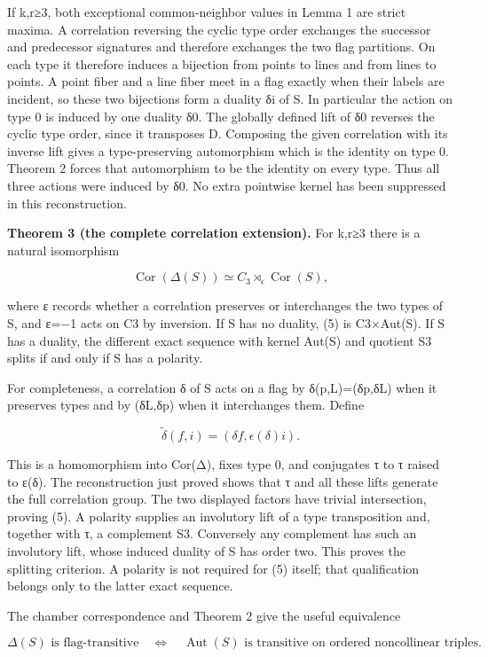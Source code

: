 If k,r≥3, both exceptional common-neighbor values in Lemma 1 are strict
maxima. A correlation reversing the cyclic type order exchanges the
successor and predecessor signatures and therefore exchanges the two
flag partitions. On each type it therefore induces a bijection from
points to lines and from lines to points. A point fiber and a line fiber
meet in a flag exactly when their labels are incident, so these two
bijections form a duality δi of S. In particular the action on type 0 is
induced by one duality δ0. The globally defined lift of δ0 reverses the
cyclic type order, since it transposes D. Composing the given
correlation with its inverse lift gives a type-preserving automorphism
which is the identity on type 0. Theorem 2 forces that automorphism to
be the identity on every type. Thus all three actions were induced by
δ0. No extra pointwise kernel has been suppressed in this
reconstruction.

\textbf{Theorem 3 (the complete correlation extension).} For k,r≥3 there
is a natural isomorphism

\[
 \operatorname{Cor}(\Delta(S))\simeq C_3\rtimes_\epsilon
 \operatorname{Cor}(S),
\tag{5}
\]

where ε records whether a correlation preserves or interchanges the two
types of S, and ε=−1 acts on C3 by inversion. If S has no duality, (5)
is C3×Aut(S). If S has a duality, the different exact sequence with
kernel Aut(S) and quotient S3 splits if and only if S has a polarity.

For completeness, a correlation δ of S acts on a flag by δ(p,L)=(δp,δL)
when it preserves types and by (δL,δp) when it interchanges them. Define

\[
 \widetilde\delta(f,i)=(\delta f,\epsilon(\delta)i).
\]

This is a homomorphism into Cor(Δ), fixes type 0, and conjugates τ to τ
raised to ε(δ). The reconstruction just proved shows that τ and all
these lifts generate the full correlation group. The two displayed
factors have trivial intersection, proving (5). A polarity supplies an
involutory lift of a type transposition and, together with τ, a
complement S3. Conversely any complement has such an involutory lift,
whose induced duality of S has order two. This proves the splitting
criterion. A polarity is not required for (5) itself; that qualification
belongs only to the latter exact sequence.

The chamber correspondence and Theorem 2 give the useful equivalence

\[
 \Delta(S)\text{ is flag-transitive}\quad\Longleftrightarrow\quad
 \operatorname{Aut}(S)\text{ is transitive on ordered noncollinear triples}.
\tag{6}
\]

